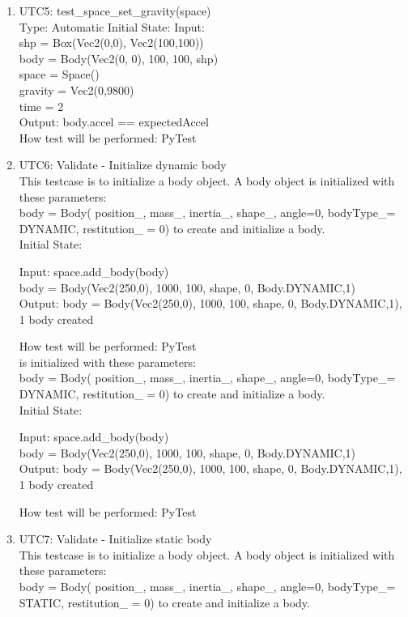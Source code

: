 \documentclass[12pt, titlepage]{article}
\begin{document}
\begin{enumerate}
\item{UTC5}{: test\_space\_set\_gravity(space)\\}
Type: Automatic
Initial State: 
Input: \\
shp = Box(Vec2(0,0), Vec2(100,100))\\
body = Body(Vec2(0, 0), 100, 100, shp)\\
space = Space()\\
gravity = Vec2(0,9800)\\
time = 2\\
Output: body.accel == expectedAccel\\
How test will be performed: PyTest\\

\item{UTC6}{: Validate - Initialize dynamic body\\}
This testcase is to initialize a body object.
A body object is initialized with these parameters:\\ 
body = Body( position\_, mass\_, inertia\_, shape\_, angle=0, bodyType\_= DYNAMIC, restitution\_ = 0) to create and initialize a body.\\

Initial State: 

Input: space.add\_body(body)\\
body = Body(Vec2(250,0), 1000, 100, shape, 0, Body.DYNAMIC,1)\\

Output: body = Body(Vec2(250,0), 1000, 100, shape, 0, Body.DYNAMIC,1), 1 body created

How test will be performed: PyTest\\ is initialized with these parameters:\\ 
body = Body( position\_, mass\_, inertia\_, shape\_, angle=0, bodyType\_= DYNAMIC, restitution\_ = 0) to create and initialize a body.\\

Initial State: 

Input: space.add\_body(body)\\
body = Body(Vec2(250,0), 1000, 100, shape, 0, Body.DYNAMIC,1)\\

Output: body = Body(Vec2(250,0), 1000, 100, shape, 0, Body.DYNAMIC,1), 1 body created

How test will be performed: PyTest\\

\item{UTC7}{: Validate - Initialize static body\\}
This testcase is to initialize a body object.
A body object is initialized with these parameters:\\ 
body = Body( position\_, mass\_, inertia\_, shape\_, angle=0, bodyType\_= STATIC, restitution\_ = 0) to create and initialize a body.\\


\end{enumerate}
\end{document}
